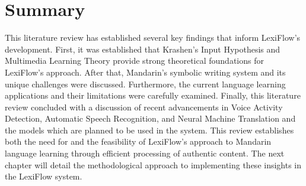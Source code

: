 \documentclass[oneside]{utmthesis}
\begin{document}
\section{Summary}
This literature review has established several key findings that inform LexiFlow's development. First, it was established that Krashen's Input Hypothesis and Multimedia Learning Theory provide strong theoretical foundations for LexiFlow's approach. After that, Mandarin's symbolic writing system and its unique challenges were discussed. Furthermore, the current language learning applications and their limitations were carefully examined. Finally, this literature review concluded with a discussion of recent advancements in Voice Activity Detection, Automatic Speech Recognition, and Neural Machine Translation and the models which are planned to be used in the system.
This review establishes both the need for and the feasibility of LexiFlow's approach to Mandarin language learning through efficient processing of authentic content. The next chapter will detail the methodological approach to implementing these insights in the LexiFlow system.
\end{document}
